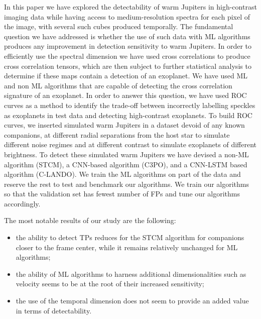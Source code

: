 \documentclass{aa}
\begin{document}
In this paper we have explored the detectability of warm Jupiters in high-contrast imaging data while having access to medium-resolution spectra for each pixel of the image, with several such cubes produced temporally.
The fundamental question we have addressed is whether the use of such data with ML algorithms produces any improvement in detection sensitivity to warm Jupiters.
In order to efficiently use the spectral dimension we have used cross correlations to produce cross correlation tensors, which are then subject to further statistical analysis to determine if these maps contain a detection of an exoplanet.
We have used ML and non ML algorithms that are capable of detecting the cross correlation signature of an exoplanet. %
In order to answer this question, we have used ROC curves as a method to identify the trade-off between incorrectly labelling speckles as exoplanets in test data and detecting high-contrast exoplanets.
To build ROC curves, we inserted simulated warm Jupiters in a dataset devoid of any known companions, at different radial separations from the host star to simulate different noise regimes and at different contrast to simulate exoplanets of different brightness.
To detect these simulated warm Jupiters we have devised a non-ML algorithm (STCM), a CNN-based algorithm (C3PO), and a CNN-LSTM based algorithm (C-LANDO). 
We train the ML algorithms on part of the data and reserve the rest to test and benchmark our algorithms. 
We train our algorithms so that the validation set has fewest number of FPs and tune our algorithms accordingly. 

The most notable results of our study are the following:
\begin{itemize}
    \item the ability to detect TPs reduces for the STCM algorithm for companions closer to the frame center, while it remains relatively unchanged for ML algorithms;
    \item the ability of ML algorithms to harness additional dimensionalities such as velocity seems to be at the root of their increased sensitivity;
    \item the use of the temporal dimension does not seem to provide an added value in terms of detectability.%
\end{itemize}
\end{document}
